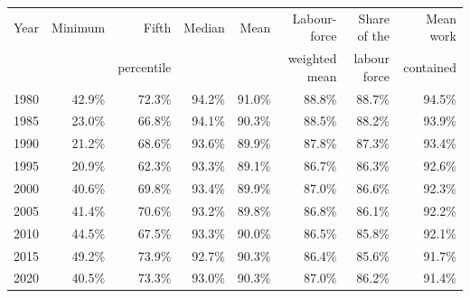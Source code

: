 \begin{tabular}{lrrrrrrr}
\toprule
Year & Minimum & Fifth & Median & Mean & Labour-force & Share of the & Mean work \\& & percentile & & & weighted mean & labour force & contained \\
\midrule
1980 & 42.9\% & 72.3\% & 94.2\% & 91.0\% & 88.8\% & 88.7\% & 94.5\% \\
1985 & 23.0\% & 66.8\% & 94.1\% & 90.3\% & 88.5\% & 88.2\% & 93.9\% \\
1990 & 21.2\% & 68.6\% & 93.6\% & 89.9\% & 87.8\% & 87.3\% & 93.4\% \\
1995 & 20.9\% & 62.3\% & 93.3\% & 89.1\% & 86.7\% & 86.3\% & 92.6\% \\
2000 & 40.6\% & 69.8\% & 93.4\% & 89.9\% & 87.0\% & 86.6\% & 92.3\% \\
2005 & 41.4\% & 70.6\% & 93.2\% & 89.8\% & 86.8\% & 86.1\% & 92.2\% \\
2010 & 44.5\% & 67.5\% & 93.3\% & 90.0\% & 86.5\% & 85.8\% & 92.1\% \\
2015 & 49.2\% & 73.9\% & 92.7\% & 90.3\% & 86.4\% & 85.6\% & 91.7\% \\
2020 & 40.5\% & 73.3\% & 93.0\% & 90.3\% & 87.0\% & 86.2\% & 91.4\% \\
\bottomrule
\end{tabular}

